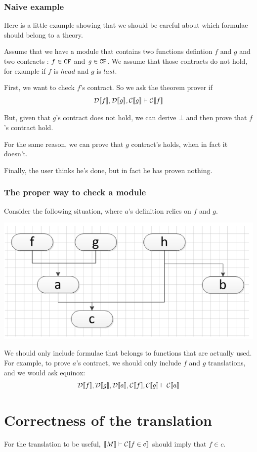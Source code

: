 \documentclass[preprint]{sigplanconf}
\begin{document}
\subsubsection{Naive example}
Here is a little example showing that we should be careful about which
formulae should belong to a theory.

Assume that we have a module that contains two functions defintion $f$
and $g$ and two contracts : $f \in \texttt{CF}$ and $g \in \texttt{CF}$. We assume
that those contracts do not hold, for example if $f$ is $head$ and $g$
is $last$.

First, we want to check $f$'s contract. So we ask the theorem prover
if
$$ \mathcal{D} \llbracket f \rrbracket, \mathcal{D} \llbracket g \rrbracket, \mathcal{C} \llbracket g \rrbracket \vdash \mathcal{C} \llbracket f \rrbracket $$

But, given that $g$'s contract does not hold, we can derive $\bot$ and
then prove that $f$'s contract hold.

For the same reason, we can prove that $g$ contract's holds, when in
fact it doesn't.

Finally, the user thinks he's done, but in fact he has proven nothing.

\subsubsection{The proper way to check a module}
Consider the following situation, where $a$'s definition relies on $f$
and $g$.
\begin{center}
\includegraphics[scale=0.5]{flow.png}
\end{center}

We should only include formulae that belongs to functions that are
actually used. For example, to prove $a$'s contract, we should only
include $f$ and $g$ translations, and we would ask equinox:
$$ \mathcal{D} \llbracket f \rrbracket,\mathcal{D} \llbracket g \rrbracket,\mathcal{D} \llbracket a \rrbracket,\mathcal{C} \llbracket f \rrbracket,\mathcal{C} \llbracket g \rrbracket \vdash
\mathcal{C} \llbracket a \rrbracket$$


\section{Correctness of the translation}
For the translation to be useful, $\llbracket M \rrbracket \vdash \mathcal{C} \llbracket f \in c \rrbracket $
should imply that $f \in c$.
\end{document}
